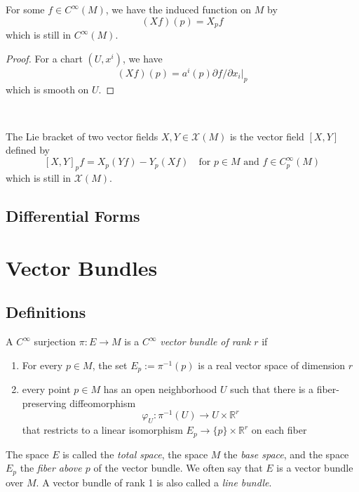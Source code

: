 \begin{proposition}
    For some $f\in C^{\infty}(M)$, we have the induced function on $M$ by
    \[
    (Xf)(p) = X_pf
    \]
    which is still in $C^{\infty}(M)$.
\end{proposition}
\begin{proof}
    For a chart $(U,x^i)$, we have
    \[
    (Xf)(p) = a^i(p) \partial f/\partial x_i|_p
    \]
    which is smooth on $U$.
\end{proof}
\
\begin{definition}
    The Lie bracket of two vector fields $X,Y \in \mathscr{X}(M)$ is the vector field $[X,Y]$ defined by
    \[[X,Y]_p f = X_p(Yf) - Y_p(Xf)\quad\text{for }p\in M\text{ and }f\in C^{\infty}_p(M)\]
    which is still in $\mathscr{X}(M)$.
\end{definition}

\subsection{Differential Forms}

\section{Vector Bundles}

\subsection{Definitions}

\begin{definition}
A $C^{\infty}$ surjection $\pi : E \to M$ is a $C^{\infty}$ \emph{vector bundle of rank} $r$ if
\begin{enumerate}
    \item For every $p \in M$, the set $E_p := \pi^{-1}(p)$ is a real vector space of dimension $r$
    \item every point $p \in M$ has an open neighborhood $U$ such that there is a fiber-preserving diffeomorphism
    \[
    \varphi_U : \pi^{-1}(U) \to U \times \mathbb{R}^r
    \]
    that restricts to a linear isomorphism $E_p \to \{p\} \times \mathbb{R}^r$ on each fiber
\end{enumerate}
The space $E$ is called the \emph{total space}, the space $M$ the \emph{base space}, and the space $E_p$ the \emph{fiber above $p$} of the vector bundle. We often say that $E$ is a vector bundle over $M$. A vector bundle of rank 1 is also called a \emph{line bundle}.
\end{definition}

